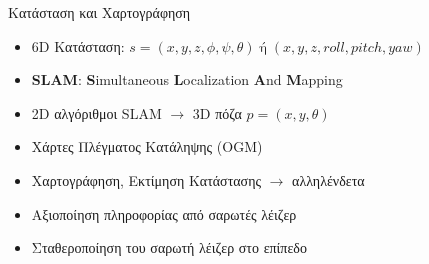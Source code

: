 \documentclass[10pt, compress, handout]{beamer} %
\begin{document}
\begin{frame}{Κατάσταση και Χαρτογράφηση}

	\begin{itemize}
		\item 6D Κατάσταση:  $s=(x,y,z,\phi,\psi,\theta)\; \text{ή}\; (x,y,z,roll,pitch,yaw)$
    	\item	\textbf{SLAM}: \textbf{S}imultaneous \textbf{L}ocalization \textbf{A}nd \textbf{M}apping
		\item 2D αλγόριθμοι SLAM $\rightarrow$ 3D πόζα $p=(x,y,\theta)$
		\item Χάρτες Πλέγματος Κατάληψης (OGM)
		\item Χαρτογράφηση, Εκτίμηση Κατάστασης $\rightarrow$ αλληλένδετα
		\item Αξιοποίηση πληροφορίας από σαρωτές λέιζερ
		\item Σταθεροποίηση του σαρωτή λέιζερ στο επίπεδο
	\end{itemize}
	\vspace{-0.5cm}
	\begin{figure}[!ht]
		\hspace{0.1cm}
	\end{figure}		
\end{frame}
\end{document}
